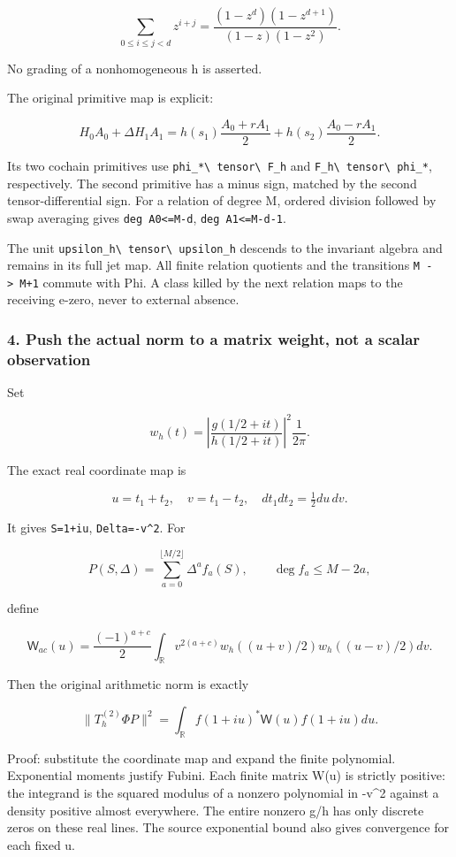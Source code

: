 \[\sum_{0\le i\le j<d}z^{i+j}=\frac{(1-z^d)(1-z^{d+1})}{(1-z)(1-z^2)}.\]

No grading of a nonhomogeneous h is asserted.

The original primitive map is explicit:

\[H_0A_0+\Delta H_1A_1=h(s_1)\frac{A_0+rA_1}{2}+h(s_2)\frac{A_0-rA_1}{2}.\]

Its two cochain primitives use \nolinkurl{phi_*\ tensor\ F_h} and \nolinkurl{F_h\ tensor\ phi_*},
respectively. The second primitive has a minus sign, matched by the second tensor-differential sign.
For a relation of degree M, ordered division followed by swap averaging gives
\texttt{deg\ A0\textless{}=M-d}, \texttt{deg\ A1\textless{}=M-d-1}.

The unit \nolinkurl{upsilon_h\ tensor\ upsilon_h} descends to the invariant algebra and remains in
its full jet map. All finite relation quotients and the transitions \texttt{M\ -\textgreater{}\ M+1}
commute with Phi. A class killed by the next relation maps to the receiving e-zero, never to
external absence.

\subsubsection{4. Push the actual norm to a matrix weight, not a scalar
observation}\label{pr_17:push-the-actual-norm-to-a-matrix-weight-not-a-scalar-observation}

Set

\[w_h(t)=\left|\frac{g(1/2+it)}{h(1/2+it)}\right|^2\frac1{2\pi}.\]

The exact real coordinate map is

\[u=t_1+t_2,\quad v=t_1-t_2,\quad dt_1dt_2=\tfrac12du\,dv.\]

It gives \nolinkurl{S=1+iu}, \texttt{Delta=-v\^{}2}. For

\[P(S,\Delta)=\sum_{a=0}^{\lfloor M/2\rfloor}\Delta^a f_a(S),\qquad\deg f_a\le M-2a,\]

define

\[\boxed{\mathsf W_{ac}(u)=\frac{(-1)^{a+c}}2\int_{\mathbb R}v^{2(a+c)}w_h((u+v)/2)w_h((u-v)/2)dv.}\]

Then the original arithmetic norm is exactly

\[\boxed{\|T_h^{(2)}\Phi P\|^2=\int_{\mathbb R}f(1+iu)^*\mathsf W(u)f(1+iu)du.}\]

Proof: substitute the coordinate map and expand the finite polynomial. Exponential moments justify
Fubini. Each finite matrix W(u) is strictly positive: the integrand is the squared modulus of a
nonzero polynomial in -v\^{}2 against a density positive almost everywhere. The entire nonzero g/h
has only discrete zeros on these real lines. The source exponential bound also gives convergence for
each fixed u.

